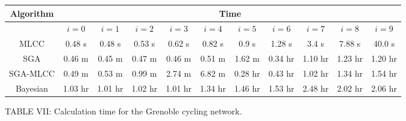 \documentclass[lettersize,journal]{IEEEtran}
\begin{document}
\begin{figure}[h!]
   \begin{minipage}{\textwidth}
    \centering
    \captionsetup{labelformat=empty} %
    \renewcommand{\thetable}{TABLE \arabic{table}} %
    \footnotesize
    \begin{tabular}{|c|c|c|c|c|c|c|c|c|c|c|}
    \hline
    \textbf{Algorithm} & \multicolumn{10}{|c|}{\textbf{Time}} \\ \hline
     & $i = 0$ & $i = 1$ & $i = 2$ & $i = 3$ & $i = 4$ & $i = 5$ & $i = 6$ & $i = 7$ & $i = 8$ & $i = 9$ \\ \hline
 MLCC & 0.48 s & 0.48 s & 0.53 s & 0.62 s & 0.82 s & 0.9 s & 1.28 s & 3.4 s & 7.88 s & 40.0 s \\ \hline
SGA & 0.46 m & 0.45 m & 0.47 m & 0.46 m & 0.51 m & 1.62 m & 0.34 hr & 1.10 hr & 1.23 hr & 1.20 hr \\ \hline
SGA-MLCC & 0.49 m & 0.53 m & 0.99 m & 2.74 m & 6.82 m & 0.28 hr & 0.43 hr & 1.02 hr & 1.34 hr & 1.54 hr \\ \hline
Bayesian & 1.03 hr & 1.01 hr & 1.02 hr & 1.01 hr & 1.34 hr & 1.46 hr & 1.53 hr & 2.48 hr & 2.02 hr & 2.06 hr \\ \hline

 
    \end{tabular}
    \caption{TABLE VII: Calculation time for the Grenoble cycling network.}
    \label{grenoble_time_table}
  \end{minipage}
\end{figure}

\end{document}
